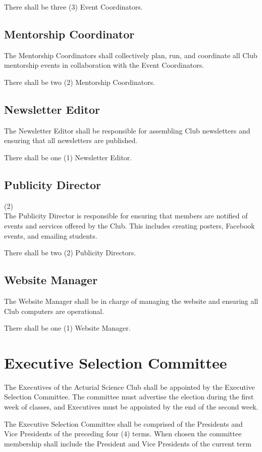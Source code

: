 \documentclass[11pt]{mathsoc}
\begin{document}
There shall be three (3) Event Coordinators.

\subsection{Mentorship Coordinator}
The Mentorship Coordinators shall collectively plan, run, and coordinate all 
Club mentorship events in collaboration with the Event Coordinators.

There shall be two (2) Mentorship Coordinators.

\subsection{Newsletter Editor}
The Newsletter Editor shall be responsible for assembling Club newsletters
and ensuring that all newsletters are published.

There shall be one (1) Newsletter Editor.

\subsection{Publicity Director} (2)\\
The Publicity Director is responsible for ensuring that members are notified 
of events and services offered by the Club. This includes creating posters, 
Facebook events, and emailing students. 

There shall be two (2) Publicity Directors.

\subsection{Website Manager} 
The Website Manager shall be in charge of managing the website and ensuring 
all Club computers are operational.

There shall be one (1) Website Manager.

\section{Executive Selection Committee}
The Executives of the Acturial Science Club shall be appointed by the 
Executive Selection Committee. The committee must advertise the election
during the first week of classes, and Executives must be appointed by the end
of the second week.

The Executive Selection Committee shall be comprised of the Presidents and Vice 
Presidents of the preceding four (4) terms. When chosen the committee membership
shall include the President and Vice Presidents of the current term
\end{document}
